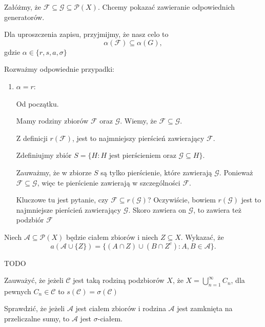 \begin{solution}
	Załóżmy, że $\mathcal{F} \subseteq \mathcal{G} \subseteq \mathcal{P}(X) $. Chcemy pokazać zawieranie odpowiednich generatorów. 
	
	Dla uproszczenia zapisu, przyjmijmy, że nasz celo to  
	 \[
	\alpha \left( \mathcal{F} \right) \subseteq \alpha \left( G \right) 
	,\] 
	gdzie $\alpha \in \{r,s,a,\sigma \} $
	
	Rozważmy odpowiednie przypadki:
	\begin{enumerate}[label=\arabic*)]
		\item $\alpha = r$:

		Od początku.

		Mamy rodziny zbiorów $\mathcal{F}$ oraz $\mathcal{G}$. Wiemy, że $\mathcal{F}\subseteq \mathcal{G}$. 

		Z definicji $r\left( \mathcal{F} \right) $, jest to najmniejszy pierścień zawierający $\mathcal{F}$.

		Zdefiniujmy zbiór $S = \{ H: H  \text{ jest pierścieniem oraz }  \mathcal{G} \subseteq H \}.$

		Zauważmy, że w zbiorze $S$ są tylko pierścienie, które zawierają $\mathcal{G}$. Ponieważ $\mathcal{F} \subseteq \mathcal{G}$, więc te pierścienie zawierają w szczególności $\mathcal{F}. $

		Kluczowe tu jest pytanie, czy $\mathcal{F} \subseteq r\left( \mathcal{G} \right) $? Oczywiście, bowiem $r\left( \mathcal{G} \right) $ jest to najmniejsze pierścień zawierający $\mathcal{G}$. Skoro zawiera on $\mathcal{G}$, to zawiera też podzbiór $\mathcal{F}$
	\end{enumerate}
\end{solution} 
\begin{problem}[10.1.6]
	Niech $\mathcal{A} \subseteq \mathcal{P}(X) $ będzie ciałem zbiorów i niech $Z \subseteq X$. Wykazać, że
	\[
	a\left( \mathcal{A} \cup \{ Z\}  \right) = \{\left( A \cap Z \right) \cup \left( B \cap Z^{c} \right): A,B \in \mathcal{A} \} 
	.\] 
\end{problem} 
\begin{solution}
	TODO
\end{solution} 
\begin{problem}[10.1.7]
	Zauważyć, że jeżeli $\mathcal{C}$ jest taką rodziną podzbiorów $X$, że $X = \bigcup_{n=1} ^{\infty}C_{n}$, dla pewnych $C_{n} \in \mathcal{C}$ to $s(\mathcal{C}) = \sigma \left( \mathcal{C} \right) $
\end{problem} 
\begin{problem}[10.1.8]
	Sprawdzić, że jeżeli $\mathcal{A}$ jest ciałem zbiorów i rodzina $\mathcal{A}$ jest zamknięta na przeliczalne sumy, to $\mathcal{A}$ jest $\sigma$-ciałem.
\end{problem} 
